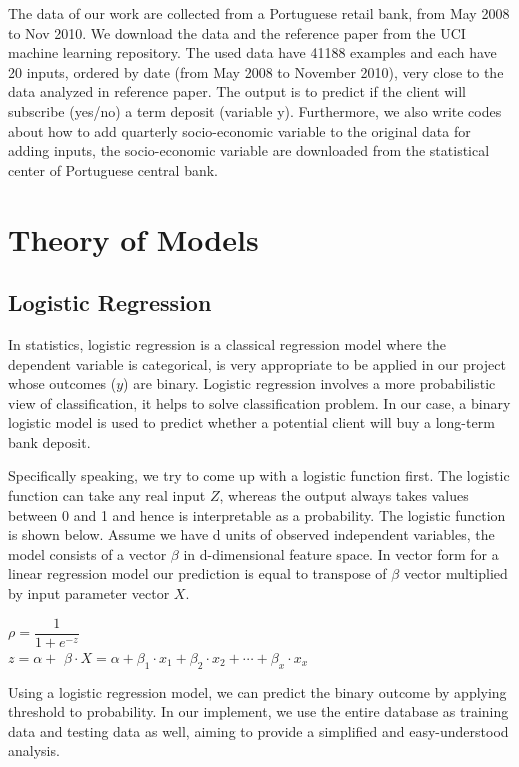 \documentclass[12pt, a4paper, bibliography=totoc, english]{scrartcl}
\begin{document}
	The data of our work are collected from a Portuguese retail bank, from May 2008 to Nov 2010. We download the data and the reference paper from the UCI machine learning repository. The used data have 41188 examples and each have 20 inputs, ordered by date (from May 2008 to November 2010), very close to the data analyzed in reference paper. The output is to predict if the client will subscribe (yes/no) a term deposit (variable y). Furthermore, we also write codes about how to add quarterly socio-economic variable to the original data for adding inputs, the socio-economic variable are downloaded from the statistical center of Portuguese central bank.
	
	\section{Theory of Models}\label{Th}
	\subsection{Logistic Regression}
	In statistics, logistic regression is a classical regression model where the dependent variable is categorical, is very appropriate to be applied in our project whose outcomes ($y$) are binary. Logistic regression involves a more probabilistic view of classification, it helps to solve classification problem. In our case, a binary logistic model is used to predict whether a potential client will buy a long-term bank deposit.
	
	Specifically speaking, we try to come up with a logistic function first. The logistic function can take any real input $Z$, whereas the output always takes values between 0 and 1 and hence is interpretable as a probability. The logistic function is shown below. Assume we have d units of observed independent variables, the model consists of a vector $\beta$ in d-dimensional feature space. In vector form for a linear regression model our prediction is equal to transpose of $\beta$ vector multiplied by input parameter vector $X$.
	\begin{center}
		$\rho=\dfrac{1}{1+e^{-z}}$\vspace{3mm}
		\\
		$z=\alpha+$ $\beta{\cdot}X$$=\alpha+\beta_1{\cdot}x_1+\beta_2{\cdot}x_2+\cdots+\beta_x{\cdot}x_x$\vspace{3mm}
	\end{center}
	Using a logistic regression model, we can predict the binary outcome by applying threshold to probability. In our implement, we use the entire database as training data and testing data as well, aiming to provide a simplified and easy-understood analysis.
	
\end{document}
